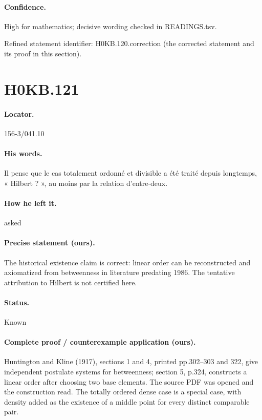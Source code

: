 \paragraph{Confidence.} High for mathematics; decisive wording checked in READINGS.tsv.

\noindent Refined statement identifier: H0KB.120.correction (the corrected statement and its proof in this section).

\section*{H0KB.121}\label{statement:H0KB.121}
\paragraph{Locator.} 156-3/041.10

\paragraph{His words.} Il pense que le cas totalement ordonné et divisible a été traité depuis longtemps, « Hilbert ? », au moins par la relation d’entre-deux.

\paragraph{How he left it.} asked

\paragraph{Precise statement (ours).} The historical existence claim is correct: linear order can be reconstructed and axiomatized from betweenness in literature predating 1986. The tentative attribution to Hilbert is not certified here.

\paragraph{Status.} Known

\paragraph{Complete proof / counterexample application (ours).} Huntington and Kline (1917), sections 1 and 4, printed pp.302--303 and 322, give independent postulate systems for betweenness; section 5, p.324, constructs a linear order after choosing two base elements. The source PDF was opened and the construction read. The totally ordered dense case is a special case, with density added as the existence of a middle point for every distinct comparable pair.

